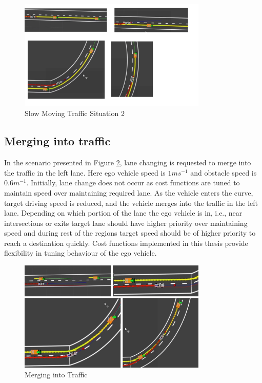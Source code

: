 \begin{figure}[h]
    \centering
    \includegraphics[width=0.8\textwidth]{Images/evaluation/slow_moving2.jpg}
    \caption{Slow Moving Traffic Situation 2}
    \label{slow_moving_2}
\end{figure}



\subsection{Merging into traffic}

In the scenario presented in Figure \ref{merging1}, lane changing is requested to merge into the traffic in the left lane. Here ego vehicle speed is $1ms^{-1}$ and obstacle speed is $0.6m^{-1}$. Initially, lane change does not occur as cost functions are tuned to maintain speed over maintaining required lane. As the vehicle enters the curve, target driving speed is reduced, and the vehicle merges into the traffic in the left lane. Depending on which portion of the lane the ego vehicle is in, i.e., near intersections or exits target lane should have higher priority over maintaining speed and during rest of the regions target speed should be of higher priority to reach a destination quickly. Cost functions implemented in this thesis provide flexibility in tuning behaviour of the ego vehicle. 

\begin{figure}
    \centering
    \includegraphics[width=0.8\textwidth]{Images/evaluation/merging1.jpg}
    \caption{Merging into Traffic}
    \label{merging1}
\end{figure}

